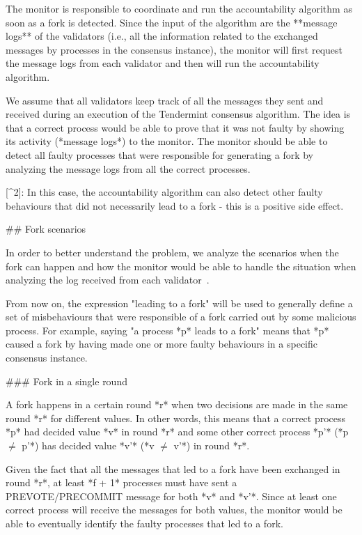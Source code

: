 \documentclass[a4paper,11pt,oneside]{report}
\begin{document}
\begin{markdown}
The monitor is responsible to coordinate and run the accountability algorithm as soon as a fork is detected. Since the input of the algorithm are the **message logs** of the validators (i.e., all the information related to the exchanged messages by processes in the consensus instance), the monitor will first request the message logs from each validator and then will run the accountability algorithm.

We assume that all validators keep track of all the messages they sent and received during an execution of the Tendermint consensus algorithm. 
The idea is that a correct process would be able to prove that it was not faulty by showing its activity (*message logs*) to the monitor.
The monitor should be able to detect all faulty processes that were responsible for generating a fork by analyzing the message logs from all the correct processes.

[^2]: In this case, the accountability algorithm can also detect other faulty behaviours that did not necessarily lead to a fork - this is a positive side effect.

## Fork scenarios

In order to better understand the problem, we analyze the scenarios when the fork can happen and how the monitor would be able to handle the situation when analyzing the log received from each validator~\cite{fork-scenarios}.

From now on, the expression "leading to a fork" will be used to generally define a set of misbehaviours that were responsible of a fork carried out by some malicious process. 
For example, saying "a process *p* leads to a fork" means that *p* caused a fork by having made one or more faulty behaviours in a specific consensus instance.

### Fork in a single round

A fork happens in a certain round *r* when two decisions are made in the same round *r* for different values.
In other words, this means that a correct process *p* had decided value *v* in round *r* and some other correct process *p'* (*p $\neq$ p'*) has decided value *v'* (*v $\neq$ v'*) in round *r*. 

Given the fact that all the messages that led to a fork have been exchanged in round *r*, at least *f + 1* processes must have sent a PREVOTE/PRECOMMIT message for both *v* and *v'*.
Since at least one correct process will receive the messages for both values, the monitor would be able to eventually identify the faulty processes that led to a fork.  


\end{markdown}
\end{document}
